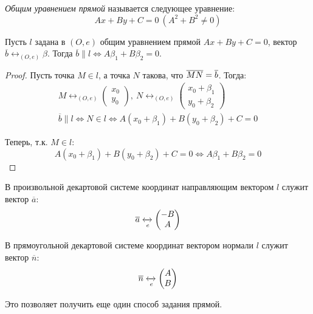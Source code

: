 \begin{definition}
	\textit{Общим уравнением прямой} называется следующее уравнение:
	\[Ax+By+C = 0~(A^2+B^2 \ne 0)\]
\end{definition}

\begin{proposition}
	Пусть $l$ задана в $(O, e)$ общим уравнением прямой $Ax+By+C=0$, вектор $\overline{b} \leftrightarrow_{(O, e)} \beta$. Тогда $\overline{b} \parallel l \Leftrightarrow A\beta_1 + B\beta_2 = 0$.
\end{proposition}

\begin{proof}
	Пусть точка $M \in l$, а точка $N$ такова, что $\overline{MN} \hm{=} \overline{b}$. Тогда:
	\begin{gather*}
	M \leftrightarrow_{(O, e)}
	\begin{pmatrix}
	x_0\\y_0
	\end{pmatrix},~
	N \leftrightarrow_{(O, e)}
	\begin{pmatrix}
	x_0 + \beta_1\\y_0 + \beta_2
	\end{pmatrix}\\
	\overline{b} \parallel l \Leftrightarrow N \in l \Leftrightarrow A(x_0 + \beta_1) + B(y_0 + \beta_2) + C = 0
	\end{gather*}
	
	Теперь, т.\:к. $M \in l$:
	\[A(x_0 + \beta_1) + B(y_0 + \beta_2) + C = 0 \Leftrightarrow A\beta_1 + B\beta_2 = 0\]
\end{proof}

\begin{corollary}
	В произвольной декартовой системе координат направляющим вектором $l$ служит вектор $\overline{a}$:
	\[\overline{a} \xleftrightarrow[e]{} \begin{pmatrix}
	-B\\A
	\end{pmatrix}\]
\end{corollary}

\begin{corollary}
	В прямоугольной декартовой системе координат вектором нормали $l$ служит вектор $\overline{n}$:
	\[\overline{n} \xleftrightarrow[e]{} \begin{pmatrix}
	A\\B
	\end{pmatrix}\]
	
	Это позволяет получить еще один способ задания прямой.
\end{corollary}

